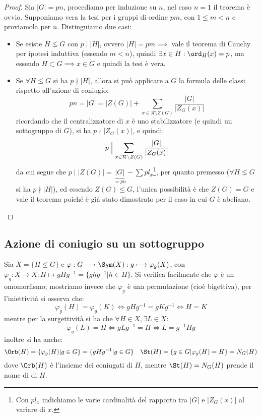 \documentclass[11pt]{scrartcl}
\begin{document}
\begin{proof}
    Sia $|G| = pn$, procediamo per induzione su $n$, nel caso $n = 1$ il teorema è ovvio. Supponiamo vera la tesi per i gruppi di ordine $pm$, con 
    $1 \leq m < n$ e proviamola per $n$. Distinguiamo due casi:
        \begin{itemize}
            \item Se esiste $H \lneq G$ con $p \mid |H|$, ovvero $|H| = pm \implies$ vale il teorema di Cauchy per ipotesi induttiva (essendo $m<n$), quindi 
            $\exists x \in H : \ord_H(x) = p$, ma essendo $H \subset G \implies x \in G$ e quindi la tesi è vera.
            \item Se $\forall H \lneq G$ si ha $p \nmid |H|$, allora si può applicare a $G$ la formula delle classi rispetto all'azione di coniugio:
                \[ pn = |G| = |Z(G)| + \sum_{x \in \mathcal{R}\setminus{Z(G)}} \frac{|G|}{|Z_G(x)|}
                    \]
                ricordando che il centralizzatore di $x$ è uno stabilizzatore (e quindi un sottogruppo di $G$), si ha $p \nmid |Z_G(x)|$, e quindi:
                    \[ p \Bigm| \sum_{x \in \mathcal{R}\setminus{Z(G)}} \frac{|G|}{|Z_G(x)|}
                        \]
                da cui segue che $p \mid |Z(G)| = \underbrace{|G|}_{= pn} - \sum pl_x$\footnote{Con $pl_x$ indichiamo le varie cardinalità del rapporto tra $|G|$ e $|Z_G(x)|$ al variare di $x$.}, per quanto premesso ($\forall H \lneq G$ si ha $p \nmid |H|$), ed essendo $Z(G) \leqslant G$, l'unica 
                possibilità è che $Z(G) = G$ e vale il teorema poiché è già stato dimostrato per il caso in cui $G$ è abeliano.
        \end{itemize}
\end{proof}

\newpage
\subsection{Azione di coniugio su un sottogruppo}
Sia $X = \{H \leqslant G\}$ e $\varphi : G \longrightarrow \Sym(X) : g \longmapsto \varphi_g(X)$, con $\varphi_g : X \longrightarrow X : H \longmapsto gHg^{-1} = \{ghg^{-1} | h \in H\}$. 
    Si verifica facilmente che $\varphi$ è un omomorfismo; mostriamo invece che $\varphi_g$ è una permutazione (cioè bigettiva), per l'iniettività si osserva che:
        \[ \varphi_g(H) = \varphi_g(K) \iff gHg^{-1} = gKg^{-1} \iff H = K
            \]
    mentre per la surgettività si ha che $\forall H \in X, \exists L \in X$:
        \[ \varphi_g(L) = H \iff gLg^{-1} = H \iff L = g^{-1}Hg
            \]
    inoltre si ha anche:
        \[ \Orb(H) = \{\varphi_g(H) | g \in G\} = \{gHg^{-1}| g \in G\} \quad \St(H) = \{g \in G | \varphi_g(H) = H\} = N_G(H)
            \]
    dove $\Orb(H)$ è l'insieme dei coniugati di $H$, mentre $\St(H) = N_G(H)$ prende il nome di  di $H$.
\end{document}
